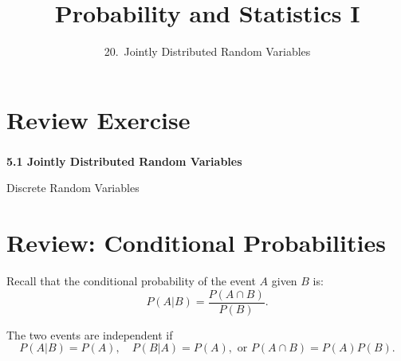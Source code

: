 

\newcommand{\lecturenum}{20}

\title[SS2857]{Probability and Statistics I}
\subtitle{\lecturenum.~Jointly Distributed Random Variables}

\date{}






{

\begin{frame}
  \addtocounter{framenumber}{-1}

  \maketitle
\end{frame}
}

\section{Review Exercise}

\begin{frame}
  \frametitle{}
  
  \begin{center}
    \Large{\textbf{5.1 Jointly Distributed Random Variables}}

    \bigskip

    \Large{Discrete Random Variables}
  \end{center}
  
\end{frame}

\section{Review: Conditional Probabilities}

\begin{frame}

Recall that the conditional probability of the event $A$ given $B$ is:
$$
P(A|B)=\frac{P(A \cap B)}{P(B)}.
$$

\bigskip

The two events are independent if
$$
P(A|B)=P(A), \quad P(B|A)=P(A), \mbox{ or } P(A \cap B)=P(A)P(B).
$$
\end{frame}

